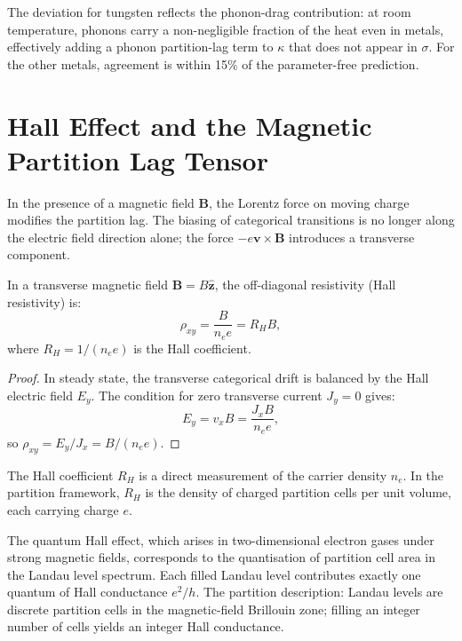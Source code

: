 The deviation for tungsten reflects the phonon-drag contribution: at room
temperature, phonons carry a non-negligible fraction of the heat even in
metals, effectively adding a phonon partition-lag term to $\kappa$ that
does not appear in $\sigma$.  For the other metals, agreement is within
15\% of the parameter-free prediction.

\section{Hall Effect and the Magnetic Partition Lag Tensor}
\label{sec:ch18-hall}

In the presence of a magnetic field $\mathbf{B}$, the Lorentz force on
moving charge modifies the partition lag.  The biasing of categorical
transitions is no longer along the electric field direction alone; the
force $-e\mathbf{v}\times\mathbf{B}$ introduces a transverse component.

\begin{theorem}
\label{thm:ch18-hall}
In a transverse magnetic field $\mathbf{B} = B\hat{\mathbf{z}}$, the
off-diagonal resistivity (Hall resistivity) is:
\begin{equation}
  \rho_{xy} = \frac{B}{n_e e} = R_H B,
  \label{eq:ch18-hall}
\end{equation}
where $R_H = 1/(n_e e)$ is the Hall coefficient.
\end{theorem}

\begin{proof}
In steady state, the transverse categorical drift is balanced by the Hall
electric field $E_y$.  The condition for zero transverse current
$J_y = 0$ gives:
\begin{equation}
  E_y = v_x B = \frac{J_x B}{n_e e},
\end{equation}
so $\rho_{xy} = E_y/J_x = B/(n_e e)$.
\end{proof}

The Hall coefficient $R_H$ is a direct measurement of the carrier density
$n_e$.  In the partition framework, $R_H$ is the density of charged
partition cells per unit volume, each carrying charge $e$.

\begin{remark}
  The quantum Hall effect, which arises in two-dimensional electron gases
  under strong magnetic fields, corresponds to the quantisation of partition
  cell area in the Landau level spectrum.  Each filled Landau level
  contributes exactly one quantum of Hall conductance $e^2/h$.  The partition
  description: Landau levels are discrete partition cells in the
  magnetic-field Brillouin zone; filling an integer number of cells
  yields an integer Hall conductance.
\end{remark}

